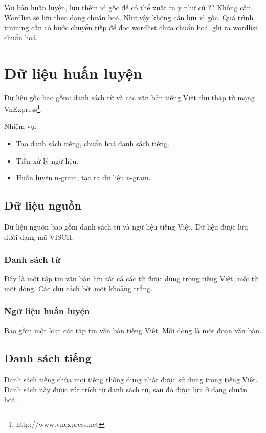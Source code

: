 \documentclass[a4paper,oneside]{book} %
\begin{document}
Với bản huấn luyện, lưu thêm id gốc để có thể xuất ra y như cũ ??
Không cần. Wordlist sẽ lưu theo dạng chuẩn hoá. Như vậy không cần lưu
id gốc. Quá trình training cần có bước chuyển tiếp để đọc wordlist
chưa chuẩn hoá, ghi ra wordlist chuẩn hoá.


\section{Dữ liệu huấn luyện}
\label{sec:data-preprocessing}

Dữ liệu gốc bao gồm: danh sách từ và các văn bản tiếng Việt thu thập
từ mạng VnExpress\footnote{http://www.vnexpress.net}.

Nhiệm vụ:
\begin{itemize}
\item Tạo danh sách tiếng, chuẩn hoá danh sách tiếng.
\item Tiền xử lý ngữ liệu.
\item Huấn luyện n-gram, tạo ra dữ liệu n-gram.
\end{itemize}


\subsection{Dữ liệu nguồn}
\label{sec:data-source}

Dữ liệu nguồn bao gồm danh sách từ và ngữ liệu tiếng Việt. Dữ liệu
được lưu dưới dạng mã VISCII. 
\subsubsection{Danh sách từ}

Đây là một tập tin văn bản lưu tất cả các từ được dùng trong tiếng
Việt, mỗi từ một dòng. Các chữ cách bởi một khoảng trắng.


\subsubsection{Ngữ liệu huấn luyện}

Bao gồm một loạt các tập tin văn bản tiếng Việt. Mỗi dòng là một đoạn
văn bản.

\subsection{Danh sách tiếng}
\label{sub:syllable-list}

Danh sách tiếng chứa mọi tiếng thông dụng nhất được sử dụng trong
tiếng Việt. Danh sách này được rút trích từ danh sách từ, sau đó được
lưu ở dạng chuẩn hoá.
\end{document}
